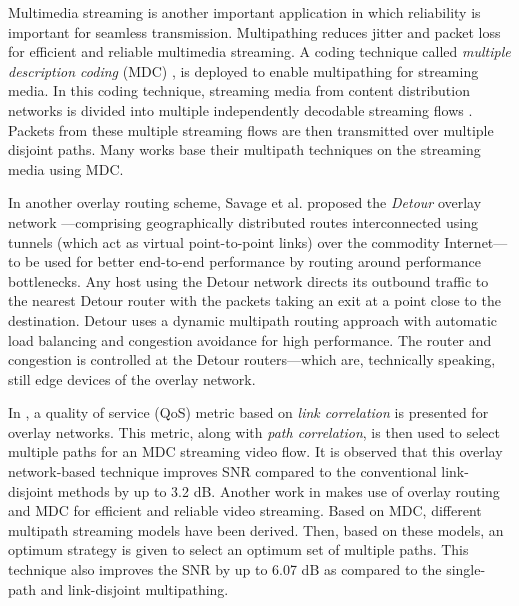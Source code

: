 \documentclass[10pt]{IEEEtran}
\begin{document}
Multimedia streaming is another important application in which reliability is important for seamless transmission. Multipathing reduces jitter and packet loss for efficient and reliable multimedia streaming. A coding technique called \textit{multiple description coding} (MDC) \cite{apostolopoulos2000reliable}, \cite{apostolopoulos2002multiple} is deployed to enable multipathing for streaming media. In this coding technique,  streaming media from content distribution networks is divided into multiple independently decodable streaming flows \cite{goyal2001multiple}. Packets from these multiple streaming flows are then transmitted over multiple disjoint paths. Many works base their multipath techniques on the streaming media using MDC.

In another overlay routing scheme, Savage et al. proposed the \textit{Detour} overlay network \cite{savage1999end}---comprising geographically distributed routes interconnected using tunnels (which  act as virtual point-to-point links) over the commodity Internet---to be used for better end-to-end performance by routing around performance bottlenecks. Any host using the Detour network directs its outbound traffic to the nearest Detour router with the packets taking an exit at a point close to the destination. Detour uses a dynamic multipath routing approach with automatic load balancing and congestion avoidance for high performance. The router and congestion is controlled at the Detour routers---which are, technically speaking, still edge devices of the overlay network.

In \cite{ma2004new}, a quality of service (QoS) metric based on \textit{link correlation} is presented for overlay networks. This metric, along with \textit{path correlation}, is then used to select multiple paths for an MDC streaming video flow. It is observed that this overlay network-based technique improves SNR compared to the conventional link-disjoint methods by up to 3.2 dB. Another work in \cite{begen2005multi} makes use of overlay routing and MDC for efficient and reliable video streaming. Based on MDC, different multipath streaming models have been derived. Then, based on these models, an optimum strategy is given to select an optimum set of multiple paths. This technique also improves the SNR by up to 6.07 dB as compared to the single-path and link-disjoint multipathing.
\end{document}
